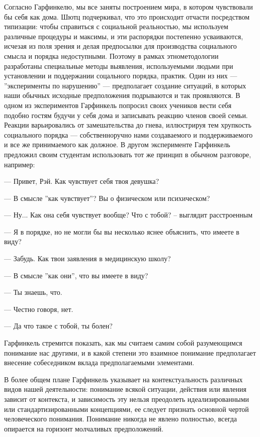 \documentclass[11pt]{book}
\begin{document}
Согласно Гарфинкелю, мы все заняты построением мира, в котором чувствовали бы себя как дома. Шютц подчеркивал, что это происходит отчасти посредством типизации: чтобы справиться с социальной реальностью, мы используем различные процедуры и максимы, и эти распорядки постепенно усваиваются, исчезая из поля зрения и делая предпосылки для производства социального смысла и порядка недоступными. Поэтому в рамках этнометодологии разработаны специальные методы выявления, используемыми людьми при установлении и поддержании соцального порядка, практик. Один из них --- ''эксперименты по нарушению'' --- предполагает создание ситуаций, в которых наши обычных исходные предположения подрываются и так проявляются. В одном из экспериментов Гарфинкель попросил своих учеников вести себя подобно гостям будучи у себя дома и записывать реакцию членов своей семьи. Реакции варьировались от замешательства до гнева, иллюстрируя тем хрупкость социального порядка --- собственноручно нами создаваемого и поддерживаемого и все же принимаемого как должное. В другом эксперименте Гарфинкель предложил своим студентам использовать тот же принцип в обычном разговоре, например:

\smallskip
{}\relax
{}\relax

--- Привет, Рэй. Как чувствует себя твоя девушка?

--- В смысле ''как чувствует''? Вы о физическом или психическом?

--- Ну... Как она себя чувствует вообще? Что с тобой? -- выглядит расстроенным

--- Я в порядке, но не могли бы вы несколько яснее объяснить, что имеете в виду?

--- Забудь. Как твои заявления в медицинскую школу?

--- В смысле ''как они'', что вы имеете в виду?

--- Ты знаешь, что.

--- Честно говоря, нет.

--- Да что такое с тобой, ты болен?

\relax
{}\relax
\smallskip

Гарфинкель стремится показать, как мы считаем самим собой разумеющимся понимание нас другими, и в какой степени это взаимное понимание предполагает внесение собеседником вклада предполагаемыми элементами.

В более общем плане Гарфинкель указывает на контекстуальность различных видов нашей деятельности: понимание всякой ситуации, действия или явления зависит от контекста, и зависимость эту нельзя преодолеть идеализированными или стандартизированными концепциями, ее следует признать основной чертой человеческого понимания. Понимание никогда не явлено полностью, всегда опирается на горизонт молчаливых предположений.
\end{document}
